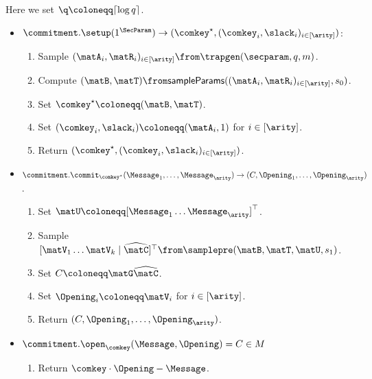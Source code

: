 	\begin{construction}
		Here we set $\q \coloneqq \lceil \log q \rceil$.
		\begin{itemize}[noitemsep]
			\item[] $\commitment.\setup(1^\SecParam) \rightarrow (\comkey^\star,(\comkey_i,\slack_i)_{i\in [\arity]})$:
			\begin{enumerate}[nolistsep]
        \item Sample $(\matA_i, \matR_i)_{i \in [\arity]} \from \trapgen(\secparam, q, m)$.
        \item Compute $(\matB, \matT) \from \sampleParams((\matA_i, \matR_i)_{i \in [\arity]}, s_0)$.
				\item Set $\comkey^\star \coloneqq (\matB, \matT)$.
				\item Set $(\comkey_i, \slack_i) \coloneqq (\matA_i, 1)$ for $i \in [\arity]$.
				\item Return $(\comkey^\star,(\comkey_i,\slack_i)_{i\in [\arity]})$.
			\end{enumerate}
		\end{itemize}
		\begin{itemize}[noitemsep]
			\item[] $\commitment.\commit_{\comkey^\star}(\Message_1,\ldots,\Message_\arity) \rightarrow (C, \Opening_1,\ldots,\Opening_\arity)$.
			\begin{enumerate}[nolistsep]
				\item Set $\matU \coloneqq [\Message_1 \dots \Message_\arity]^\top$.
				\item Sample $[\matV_1 \dots \matV_k \;\vert\; \widehat{\matC}]^\top \from \samplepre(\matB, \matT, \matU, s_1)$.
				\item Set $C \coloneqq \matG \widehat{\matC}$.
				\item Set $\Opening_i \coloneqq \matV_i$ for $i \in [\arity]$.
				\item Return $(C, \Opening_1,\ldots,\Opening_\arity)$.
			\end{enumerate}
		\end{itemize}
		\begin{itemize}[noitemsep]
			\item[] $\commitment.\open_{\comkey}(\Message, \Opening) = C \in M$ 
      \begin{enumerate}[nolistsep]
				\item Return $\comkey \cdot \Opening - \Message$.
			\end{enumerate}
		\end{itemize}
	\end{construction}

